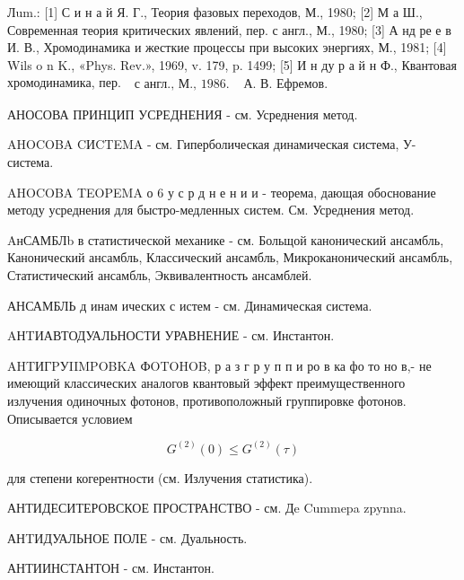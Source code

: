 \documentclass[10pt]{article}
\begin{document}
Лum.: [1] С и н а й Я. Г., Теория фазовых переходов, М., 1980; [2] М а Ш., Современная теория критических явлений, пер. с англ., М., 1980; [3] А нд ре е в И. В., Хромодинамика и жесткие процессы при высоких энергиях, М., 1981; [4] Wils o n K., «Phys. Rev.», 1969, v. 179, p. 1499; [5] И н ду р а й н Ф., Квантовая хромодинамика, пер. $\begin{array}{ll}\text { с англ., М., } 1986 . & \text { А. В. Ефремов. }\end{array}$



АНОСОВА ПРИНЦИП УСРЕДНЕНИЯ - см. Усреднения метод.



AHOCOBA CИCTEMA - см. Гиперболическая динамическая система, У-система.



AHOCOBA TEOPEMA о 6 у с р д н е н и и - теорема, дающая обоснование методу усреднения для быстро-медленных систем. См. Усреднения метод.



AнСАМБЛb в статистической механике - см. Больщой канонический ансамбль, Канонический ансамбль, Классический ансамбль, Микроканонический ансамбль, Статистический ансамбль, Эквивалентность ансамблей.



АНСАМБЛЬ д инам ических с истем - см. Динамическая система.



AНTИАВТОДУАЛЬНОСТИ УРАВНЕНИЕ - см. Инстантон.



AHTИГPУIIMPOBKA ФOTOHOB, р а з г р у п п и ро в ка фо то но в,- не имеющий классических аналогов квантовый эффект преимущественного излучения одиночных фотонов, противоположный группировке фотонов. Описывается условием



\[

G^{(2)}(0) \leqslant G^{(2)}(\tau)

\]



для степени когерентности (см. Излучения статистика).



АНТИДЕСИТЕРОВСКОЕ ПРОСТРАНСТВО - см. Дe Cummepa zpynna.



АНTИДУАЛЬНОЕ ПОЛЕ - см. Дуальность.



АНТИИНСТАНТОН - см. Инстантон.
\end{document}
